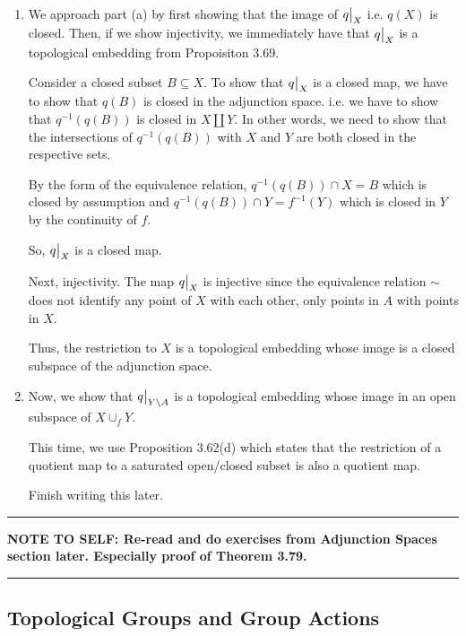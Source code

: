 \documentclass{article}
\newcommand{\restr}[2]{{%
  \left.\kern-\nulldelimiterspace %
  #1 %
  \vphantom{\big|} %
  \right|_{#2} %
  }}
\begin{document}
\begin{enumerate}
  \item We approach part (a) by first showing that the image of $\restr{q}{X}$ i.e. $q(X)$ is closed. Then, if we show injectivity, we immediately have that $\restr{q}{X}$ is a topological embedding from Propoisiton 3.69.
  
  \vskip 0.5cm
  Consider a closed subset $B \subseteq X$. To show that $\restr{q}{X}$ is a closed map, we have to show that $q(B)$ is closed in the adjunction space. i.e. we have to show that $q^{-1}(q(B))$ is closed in $X \coprod Y$. In other words, we need to show that the intersections of $q^{-1}(q(B))$ with $X$ and $Y$ are both closed in the respective sets.

  By the form of the equivalence relation, $q^{-1}(q(B)) \cap X = B$ which is closed by assumption and $q^{-1}(q(B)) \cap Y = f^{-1}(Y)$ which is closed in $Y$ by the continuity of $f$.
  
  So, $\restr{q}{X}$ is a closed map.
  
  \vskip 0.5cm
  Next, injectivity. The map $\restr{q}{X}$ is injective since the equivalence relation $\sim$ does not identify any point of $X$ with each other, only points in $A$ with points in $X$.

  Thus, the restriction to $X$ is a topological embedding whose image is a closed subspace of the adjunction space.
  
  \vskip 0.5cm
  \item Now, we show that $\restr{q}{Y \setminus A}$ is a topological embedding whose image in an open subspace of $X \cup_f Y$.
  
  This time, we use Proposition 3.62(d) which states that the restriction of a quotient map to a saturated open/closed subset is also a quotient map.

  Finish writing this later.
  
\end{enumerate}

\vskip 0.5cm
\hrule
\vskip 0.5cm

\textbf{NOTE TO SELF: Re-read and do exercises from Adjunction Spaces section later. Especially proof of Theorem 3.79.}

\vskip 0.5cm
\hrule
\vskip 0.5cm

\subsection{Topological Groups and Group Actions}
\end{document}

